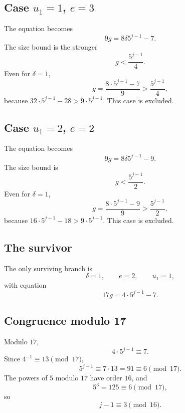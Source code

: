\subsection{Case $u_1=1$, $e=3$}

The equation becomes
\begin{equation*}
  9g=8\delta5^{j-1}-7.
\end{equation*}
The size bound is the stronger
\begin{equation*}
  g<\frac{5^{j-1}}{4}.
\end{equation*}
Even for $\delta=1$,
\begin{equation*}
  g=\frac{8\cdot5^{j-1}-7}{9}
  >\frac{5^{j-1}}{4},
\end{equation*}
because $32\cdot5^{j-1}-28>9\cdot5^{j-1}$.  This case is excluded.

\subsection{Case $u_1=2$, $e=2$}

The equation becomes
\begin{equation*}
  9g=8\delta5^{j-1}-9.
\end{equation*}
The size bound is
\begin{equation*}
  g<\frac{5^{j-1}}{2}.
\end{equation*}
Even for $\delta=1$,
\begin{equation*}
  g=\frac{8\cdot5^{j-1}-9}{9}
  >\frac{5^{j-1}}{2},
\end{equation*}
because $16\cdot5^{j-1}-18>9\cdot5^{j-1}$.  This case is excluded.

\subsection{The survivor}

The only surviving branch is
\begin{equation*}
  \delta=1,\qquad e=2,\qquad u_1=1,
\end{equation*}
with equation
\begin{equation*}
  17g=4\cdot5^{j-1}-7.
\end{equation*}

\subsection{Congruence modulo 17}

Modulo $17$,
\begin{equation*}
  4\cdot5^{j-1}\equiv7.
\end{equation*}
Since $4^{-1}\equiv13\pmod{17}$,
\begin{equation*}
  5^{j-1}\equiv7\cdot13=91\equiv6\pmod{17}.
\end{equation*}
The powers of $5$ modulo $17$ have order $16$, and
\begin{equation*}
  5^3=125\equiv6\pmod{17},
\end{equation*}
so
\begin{equation*}
  j-1\equiv3\pmod{16}.
\end{equation*}

